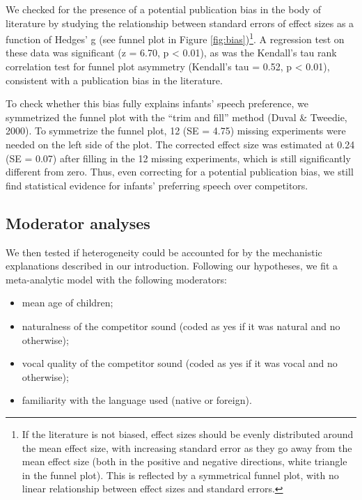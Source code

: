 \documentclass[
  english,
  man]{apa6}
\providecommand{\tightlist}{%
  \setlength{\itemsep}{0pt}\setlength{\parskip}{0pt}}
\begin{document}
We checked for the presence of a potential publication bias in the body of literature by studying the relationship between standard errors of effect sizes as a function of Hedges' g (see funnel plot in Figure \ref{fig:bias})\footnote{If the literature is not biased, effect sizes should be evenly distributed around the mean effect size, with increasing standard error as they go away from the mean effect size (both in the positive and negative directions, white triangle in the funnel plot). This is reflected by a symmetrical funnel plot, with no linear relationship between effect sizes and standard errors.}. A regression test on these data was significant (z = 6.70, p \textless{} 0.01), as was the Kendall's tau rank correlation test for funnel plot asymmetry (Kendall's tau = 0.52, p \textless{} 0.01), consistent with a publication bias in the literature.

To check whether this bias fully explains infants' speech preference, we symmetrized the funnel plot with the ``trim and fill'' method (Duval \& Tweedie, 2000). To symmetrize the funnel plot, 12 (SE = 4.75) missing experiments were needed on the left side of the plot. The corrected effect size was estimated at 0.24 (SE = 0.07) after filling in the 12 missing experiments, which is still significantly different from zero. Thus, even correcting for a potential publication bias, we still find statistical evidence for infants' preferring speech over competitors.

\hypertarget{moderator-analyses}{%
\subsection{Moderator analyses}\label{moderator-analyses}}

We then tested if heterogeneity could be accounted for by the mechanistic explanations described in our introduction. Following our hypotheses, we fit a meta-analytic model with the following moderators:

\begin{itemize}
\tightlist
\item
  mean age of children;
\item
  naturalness of the competitor sound (coded as yes if it was natural and no otherwise);
\item
  vocal quality of the competitor sound (coded as yes if it was vocal and no otherwise);
\item
  familiarity with the language used (native or foreign).
\end{itemize}
\end{document}
